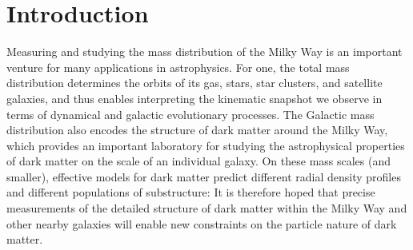 \begin{abstract}

\end{abstract}


\section{Introduction} \label{sec:intro}

Measuring and studying the mass distribution of the Milky Way is an important venture
for many applications in astrophysics.
For one, the total mass distribution determines the orbits of its gas, stars, star
clusters, and satellite galaxies, and thus enables interpreting the kinematic snapshot
we observe in terms of dynamical and galactic evolutionary processes.
The Galactic mass distribution also encodes the structure of dark matter around the
Milky Way, which provides an important laboratory for studying the astrophysical
properties of dark matter on the scale of an individual galaxy.
On these mass scales (and smaller), effective models for dark matter predict different
radial density profiles and different populations of substructure:
It is therefore hoped that precise measurements of the detailed structure of dark matter
within the Milky Way and other nearby galaxies will enable new constraints on the
particle nature of dark matter.


